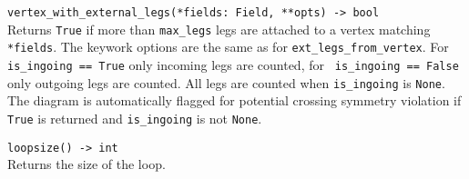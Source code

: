 \begin{basedescript}{\desclabelstyle{\pushlabel}}
   \item[\hspace{-1em}]\colorbox{gray!30}{\lstinline[style=py]{vertex_with_external_legs(*fields: Field, **opts) -> bool}} \vspace{0.1cm}\\
   Returns \texttt{True} if more than \texttt{max\_legs} legs are attached to a vertex matching \texttt{*fields}. The keywork options are the same as for \texttt{ext\_legs\_from\_vertex}. For \lstinline[style=py]| is_ingoing == True| only incoming legs are counted, for \lstinline[style=py]| is_ingoing == False| only outgoing legs are counted. All legs are counted when \texttt{is\_ingoing} is \texttt{None}. The diagram is automatically flagged for potential crossing symmetry violation if \texttt{True} is returned and \texttt{is\_ingoing} is not \texttt{None}.

   \item[\hspace{-1em}]\colorbox{gray!30}{\lstinline[style=py]|loopsize() -> int|} \vspace{0.1cm}\\
   Returns the size of the loop.
\end{basedescript}